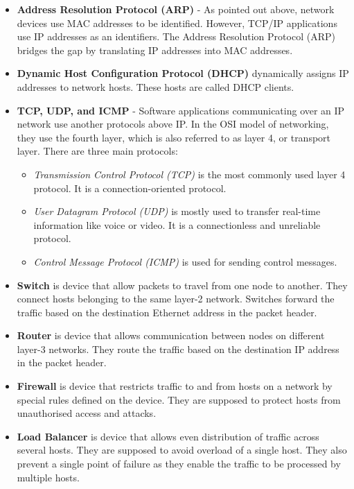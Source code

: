 \begin{itemize}
{  Each VLAN has a numerical ID between 1 and 4095. For example, a VLAN with an id of 10 will be referred to as VLAN 15.}
  \item{\textbf{Address Resolution Protocol (ARP)} - As pointed out above, network devices use MAC addresses to be identified. However, TCP/IP applications use IP addresses as an identifiers. The Address Resolution Protocol (ARP) bridges the gap by translating IP addresses into MAC addresses.}
  \item{\textbf{Dynamic Host Configuration Protocol (DHCP)} dynamically assigns IP addresses to network hosts. These hosts are called DHCP clients.}
  \item{\textbf{TCP, UDP, and ICMP} - Software applications communicating over an IP network use another protocols above IP. In the OSI model of networking, they use the fourth layer, which is also referred to as layer 4, or transport layer. There are three main protocols:
    \begin{itemize}
      \item{\textit{Transmission Control Protocol (TCP)} is the most commonly used layer 4 protocol. It is a connection-oriented protocol.}
      \item{\textit{User Datagram Protocol (UDP)} is mostly used to transfer real-time information like voice or video. It is a connectionless and unreliable protocol.}
      \item{\textit{Control Message Protocol (ICMP)} is used for sending control messages.}
    \end{itemize}
  }
  \item{\textbf{Switch} is device that allow packets to travel from one node to another. They connect hosts belonging to the same layer-2 network. Switches forward the traffic based on the destination Ethernet address in the packet header.}
  \item{\textbf{Router} is device that allows communication between nodes on different layer-3 networks. They route the traffic based on the destination IP address in the packet header.}
  \item{\textbf{Firewall} is device that restricts traffic to and from hosts on a network by special rules defined on the device. They are supposed to protect hosts from unauthorised access and attacks.}
  \item{\textbf{Load Balancer} is device that allows even distribution of traffic across several hosts. They are supposed to avoid overload of a single host. They also prevent a single point of failure as they enable the traffic to be processed by multiple hosts.}


\end{itemize}
